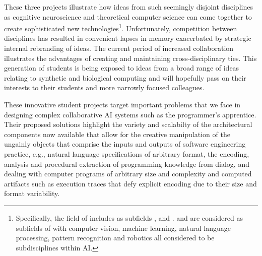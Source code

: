 These three projects illustrate how ideas from such seemingly disjoint disciplines as cognitive neuroscience and theoretical computer science can come together to create sophisticated new technologies\footnote{%
%
  Specifically, the field of {} includes as subfields {}, {} and {}. {} and {} are considered as subfields of {} with computer vision, machine learning, natural language processing, pattern recognition and robotics all considered to be subdisciplines within AI.}. 
%
Unfortunately, competition between disciplines has resulted in convenient lapses in memory exacerbated by strategic internal rebranding of ideas. The current period of increased collaboration illustrates the advantages of creating and maintaining cross-disciplinary ties. This generation of students is being exposed to ideas from a broad range of ideas relating to synthetic and biological computing and will hopefully pass on their interests to their students and more narrowly focused colleagues.


These innovative student projects target important problems that we face in designing complex collaborative AI systems such as the programmer's apprentice. Their proposed solutions highlight the variety and scalabilty of the architectural components now available that allow for the creative manipulation of the ungainly objects that comprise the inputs and outputs of software engineering practice, e.g., natural language specifications of arbitrary format, the encoding, analysis and procedural extraction of programming knowledge from dialog, and dealing with computer programs of arbitrary size and complexity and computed artifacts such as execution traces that defy explicit encoding due to their size and format variability.

